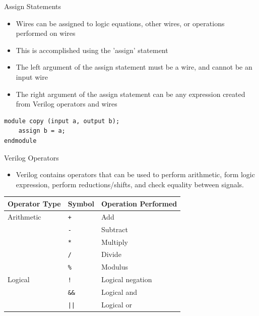 \documentclass{beamer}
\begin{document}
\begin{frame}[fragile]{Assign Statements}
	\begin{itemize}
		\item Wires can be assigned to logic equations, other wires, or operations performed on wires
		\item This is accomplished using the 'assign' statement
		\item The left argument of the assign statement must be a wire, and cannot be an input wire
		\item The right argument of the assign statement can be any expression created from Verilog operators and wires
	\end{itemize}
\begin{verbatim}
module copy (input a, output b);
	assign b = a;
endmodule
\end{verbatim}
\end{frame}

\begin{frame}[fragile]{Verilog Operators}
	\begin{itemize}
		\item Verilog contains operators that can be used to perform arithmetic, form logic expression, perform reductions/shifts, and check equality between signals.
	\end{itemize}
	\begin{center}
	\begin{tabular}{l | l | l}
		Operator Type & Symbol & Operation Performed \\ \hline
		Arithmetic & \texttt{+} & Add \\ \hline
		& \texttt{-} & Subtract \\ \hline
		& \texttt{*} & Multiply \\ \hline
		& \texttt{/} & Divide \\ \hline
		& \texttt{\%} & Modulus \\ \hline
		Logical & \texttt{!} & Logical negation \\ \hline
		& \texttt{\&\&} & Logical and \\ \hline
		& \texttt{||} & Logical or \\ \hline
	\end{tabular}
	\end{center}
\end{frame}
\end{document}
